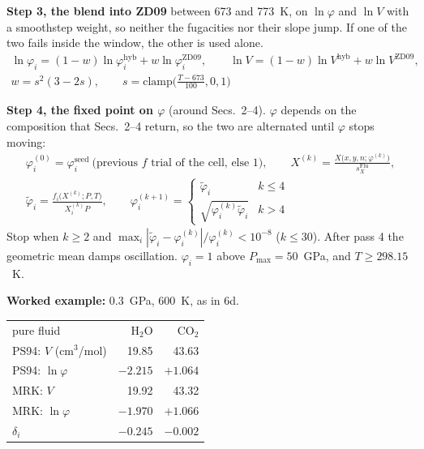 \documentclass[11pt]{article}
\begin{document}
{\begin{minipage}[t]{0.60\linewidth}
\textbf{Step 3, the blend into ZD09} between 673 and 773~K, on $\ln\varphi$ and $\ln V$ with a smoothstep weight, so neither the fugacities nor their slope jump. If one of the two fails inside the window, the other is used alone.
\begin{gather}
  \ln\varphi_i=(1-w)\ln\varphi_i^{\mathrm{hyb}}+w\ln\varphi_i^{\mathrm{ZD09}},\qquad
  \ln V=(1-w)\ln V^{\mathrm{hyb}}+w\ln V^{\mathrm{ZD09}},\nonumber\\
  w=s^2(3-2s),\qquad s=\mathrm{clamp}\Big(\frac{T-673}{100},0,1\Big)
\end{gather}

\textbf{Step 4, the fixed point on $\varphi$} (around Secs.~2--4). $\varphi$ depends on the composition that Secs.~2--4 return, so the two are alternated until $\varphi$ stops moving:
\begin{gather}
  \varphi^{(0)}_i=\varphi_i^{\text{seed}}\ \text{(previous $f$ trial of the cell, else 1)},\qquad
  X^{(k)}=\frac{X\big(x,y,n;\varphi^{(k)}\big)}{s_X^{\mathrm{Flu}}},\nonumber\\
  \tilde\varphi_i=\frac{f_i\big(X^{(k)};P,T\big)}{X^{(k)}_iP},\qquad
  \varphi^{(k+1)}_i=\begin{cases}\tilde\varphi_i & k\le4\\ \sqrt{\varphi^{(k)}_i\tilde\varphi_i} & k>4\end{cases}
\end{gather}
Stop when $k\ge2$ and $\max_i|\tilde\varphi_i-\varphi^{(k)}_i|/\varphi^{(k)}_i<10^{-8}$ ($k\le30$). After pass 4 the geometric mean damps oscillation. $\varphi_i=1$ above $P_{\max}=50$~GPa, and $T\ge298.15$~K.
\end{minipage}\hfill
\begin{minipage}[t]{0.37\linewidth}
\textbf{Worked example:} 0.3~GPa, 600~K, as in 6d.

\smallskip
\begin{tabular}{@{}l r r@{}}
  pure fluid                                & H$_2$O   & CO$_2$   \\
  PS94: $V$ (cm$^3$/mol)                    & 19.85    & 43.63    \\
  PS94: $\ln\varphi$                        & $-2.215$ & $+1.064$ \\
  MRK: $V$                                  & 19.92    & 43.32    \\
  MRK: $\ln\varphi$                         & $-1.970$ & $+1.066$ \\
  $\delta_i$                                & $-0.245$ & $-0.002$ \\
\end{tabular}


\end{minipage}}
\end{document}
